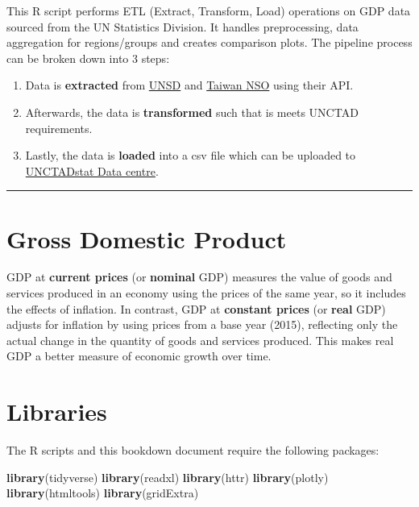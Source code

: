 \documentclass[
]{book}
\newenvironment{Shaded}{\begin{snugshade}}{\end{snugshade}}
\newcommand{\FunctionTok}[1]{\textcolor[rgb]{0.13,0.29,0.53}{\textbf{#1}}}
\newcommand{\NormalTok}[1]{#1}
\providecommand{\tightlist}{%
  \setlength{\itemsep}{0pt}\setlength{\parskip}{0pt}}
\begin{document}
This R script performs ETL (Extract, Transform, Load) operations on GDP data sourced from the UN Statistics Division. It handles preprocessing, data aggregation for regions/groups and creates comparison plots. The pipeline process can be broken down into 3 steps:

\begin{enumerate}
\def\labelenumi{\arabic{enumi}.}
\tightlist
\item
  Data is \textbf{extracted} from \href{https://unstats.un.org/unsd/amaapi/swagger/index.html}{UNSD} and \href{https://nstatdb.dgbas.gov.tw/dgbasall/webMain.aspx?k=engmain}{Taiwan NSO} using their API.
\item
  Afterwards, the data is \textbf{transformed} such that is meets UNCTAD requirements.
\item
  Lastly, the data is \textbf{loaded} into a csv file which can be uploaded to \href{https://unctadstat.unctad.org/datacentre/}{UNCTADstat Data centre}.
\end{enumerate}

\begin{center}\rule{0.5\linewidth}{0.5pt}\end{center}

\section*{Gross Domestic Product}\label{gross-domestic-product}

GDP at \textbf{current prices} (or \textbf{nominal} GDP) measures the value of goods and services produced in an economy using the prices of the same year, so it includes the effects of inflation. In contrast, GDP at \textbf{constant prices} (or \textbf{real} GDP) adjusts for inflation by using prices from a base year (2015), reflecting only the actual change in the quantity of goods and services produced. This makes real GDP a better measure of economic growth over time.

\section*{Libraries}\label{libraries}

The R scripts and this bookdown document require the following packages:

\begin{Shaded}
\begin{Highlighting}[]
\FunctionTok{library}\NormalTok{(tidyverse)}
\FunctionTok{library}\NormalTok{(readxl) }
\FunctionTok{library}\NormalTok{(httr)}
\FunctionTok{library}\NormalTok{(plotly)}
\FunctionTok{library}\NormalTok{(htmltools)}
\FunctionTok{library}\NormalTok{(gridExtra)}
\end{Highlighting}
\end{Shaded}
\end{document}
